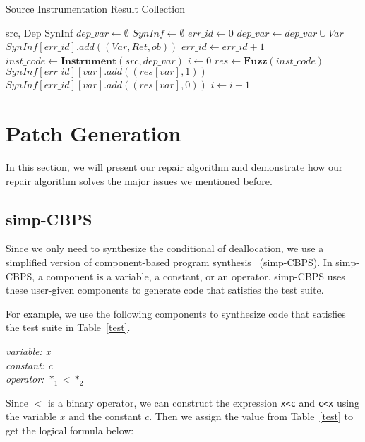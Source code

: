 \documentclass[a4paper,11pt,oneside,openany]{book}
\begin{document}
 \begin{algorithm}[t]
 \caption{Source Instrumentation Result Collection}
 \label{algo1}
 \begin{algorithmic}[1]
 \renewcommand{\algorithmicrequire}{\textbf{Input:}}
 \renewcommand{\algorithmicensure}{\textbf{Output:}}
 \REQUIRE src, Dep
 \ENSURE  SynInf
  \STATE $dep\_var \gets \emptyset$
  \STATE $SynInf \gets \emptyset$
  \STATE $err\_id \gets 0$
   \STATE $dep\_var \gets dep\_var \cup Var$
   \STATE $SynInf[err\_id].add((Var,Ret,ob))$
   \STATE $err\_id \gets err\_id + 1$
  \ENDFOR
  \STATE $inst\_code \gets \textbf{Instrument}(src, dep\_var)$
  \STATE $i \gets 0$
   \STATE $res \gets \textbf{Fuzz}(inst\_code)$
      \STATE $SynInf[err\_id][var].add((res[var],1))$
     \ELSE
      \STATE $SynInf[err\_id][var].add((res[var],0))$
     \ENDIF
     \ENDFOR
    \ENDFOR
   \STATE $i\gets i + 1$
  \ENDWHILE
 \end{algorithmic} 
 \end{algorithm}

\section{Patch Generation}
\label{patchgeneration}

In this section, we will present our repair algorithm and demonstrate how our repair algorithm solves the major issues we mentioned before.


\subsection{simp-CBPS}
Since we only need to synthesize the conditional of deallocation, we use a simplified version of component-based program synthesis~\cite{oracle} (simp-CBPS). In simp-CBPS, a component is a variable, a constant, or an operator. simp-CBPS uses these user-given components to generate code that satisfies the test suite. 

For example, we use the following components to synthesize code that satisfies the test suite in Table~\ref{test}.


\begin{minipage}{\textwidth}
    \vspace{0.2cm}
    \textsl{\hspace{0.3cm}variable: x\\\hspace{0.3cm}constant: c\\\hspace{0.3cm}operator: $*_1<*_2$\\}
\end{minipage}
Since $<$ is a binary operator, we can construct the expression \verb|x<c| and \verb|c<x| using the variable $x$ and the constant $c$. Then we assign the value from Table~\ref{test} to get the logical formula below:
\end{document}
